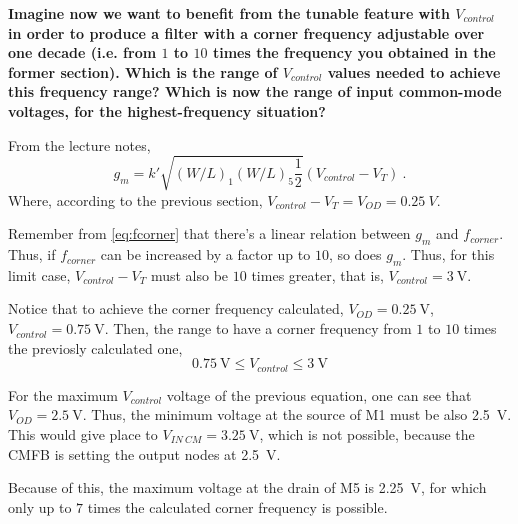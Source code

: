 \begin{pexbox}{}
	\bfseries
Imagine now we want to benefit from the tunable feature with $V_{control}$ in order to produce a filter with a corner frequency adjustable over one decade (i.e. from $1$ to $10$ times the frequency you obtained in the former section). Which is the range of $V_{control}$ values needed to achieve this frequency range? Which is now the range of input common-mode voltages, for the highest-frequency situation?
\end{pexbox}

From the lecture notes,
\begin{equation}
   g_m = k' \sqrt{\left(W/L\right)_1 \left(W/L\right)_5 \frac{1}{2}} \left(V_{control} - V_T\right) \ .
\end{equation}
%
Where, according to the previous section, $V_{control} - V_T = V_{OD} = \SI{0.25}{V}$.

Remember from \eqref{eq:fcorner} that there's a linear relation between $g_m$ and $f_{corner}$. Thus, if $f_{corner}$ can be increased by a factor up to $10$, so does $g_m$. Thus, for this limit case, $V_{control} - V_T$ must also be $10$ times greater, that is, $V_{control} = \SI{3}{\V}$.

Notice that to achieve the corner frequency calculated, $V_{OD} = \SI{0.25}{\V}$, $V_{control}= \SI{0.75}{\V}$. Then, the range to have a corner frequency from $1$ to $10$ times the previosly calculated one,
\begin{equation}
	\boxed{
		\SI{0.75}{\V} \leq V_{control} \leq \SI{3}{\V}
	}
\end{equation}


For the maximum $V_{control}$ voltage of the previous equation, one can see that $V_{OD} = \SI{2.5}{\V}$. Thus, the minimum voltage at the source of M1 must be also \SI{2.5}{\V}. This would give place to $V_{IN \ CM} = \SI{3.25}{\V}$, which is not possible, because the CMFB is setting the output nodes at \SI{2.5}{\V}.


Because of this, the maximum voltage at the drain of M5 is \SI{2.25}{\V}, for which only up to $7$ times the calculated corner frequency is possible.






